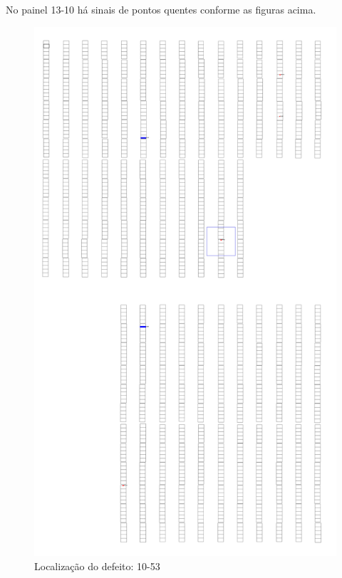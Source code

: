 \documentclass[dvipsnames]{article}%
\begin{document}
%
\FloatBarrier%
No painel 13{-}10 há sinais de pontos quentes conforme as figuras acima.\newline%
%


\begin{figure}[h!]%
\begin{minipage}{0.31\linewidth}%
\centering%
\centering%
\includegraphics[width=\linewidth]{report_images/hotspots_10-53_map.jpg}%
\caption{Localização do defeito: 10-53}%
\end{minipage}%
\hfill%
\begin{minipage}{0.31\linewidth}%

\end{minipage}
\end{figure}
\end{document}
